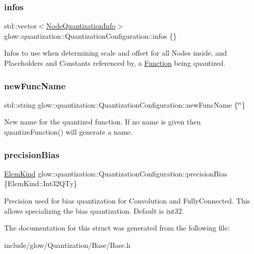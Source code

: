 \subsubsection{\texorpdfstring{infos}{infos}}
{\footnotesize\ttfamily std\+::vector$<$\hyperlink{structglow_1_1_node_quantization_info}{Node\+Quantization\+Info}$>$ glow\+::quantization\+::\+Quantization\+Configuration\+::infos \{\}}

Infos to use when determining scale and offset for all Nodes inside, and Placeholders and Constants referenced by, a \hyperlink{classglow_1_1_function}{Function} being quantized. \mbox{\label{structglow_1_1quantization_1_1_quantization_configuration_aa54e327517347c24380917155f2688bd}} 
\subsubsection{\texorpdfstring{new\+Func\+Name}{newFuncName}}
{\footnotesize\ttfamily std\+::string glow\+::quantization\+::\+Quantization\+Configuration\+::new\+Func\+Name \{\char`\"{}\char`\"{}\}}

New name for the quantized function. If no name is given then quantize\+Function() will generate a name. \mbox{\label{structglow_1_1quantization_1_1_quantization_configuration_a898c5586b41bdecc7a1c3505639167e1}} 
\subsubsection{\texorpdfstring{precision\+Bias}{precisionBias}}
{\footnotesize\ttfamily \hyperlink{namespaceglow_ab92e14a94329daf4083db670e95fbcdf}{Elem\+Kind} glow\+::quantization\+::\+Quantization\+Configuration\+::precision\+Bias \{Elem\+Kind\+::\+Int32\+Q\+Ty\}}

Precision used for bias quantization for Convolution and Fully\+Connected. This allows specializing the bias quantization. Default is int32. 

The documentation for this struct was generated from the following file\+:\begin{DoxyCompactItemize}
\item 
include/glow/\+Quantization/\+Base/Base.\+h\end{DoxyCompactItemize}
